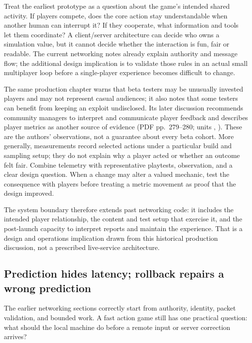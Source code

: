 Treat the earliest prototype as a question about the game's intended shared activity. If players compete, does the core action stay understandable when another human can interrupt it? If they cooperate, what information and tools let them coordinate? A client/server architecture can decide who owns a simulation value, but it cannot decide whether the interaction is fun, fair or readable. The current networking notes already explain authority and message flow; the additional design implication is to validate those rules in an actual small multiplayer loop before a single-player experience becomes difficult to change.

The same production chapter warns that beta testers may be unusually invested players and may not represent casual audiences; it also notes that some testers can benefit from keeping an exploit undisclosed. Its later discussion recommends community managers to interpret and communicate player feedback and describes player metrics as another source of evidence (PDF pp.~279--280; units , ). These are the authors' observations, not a guarantee about every beta cohort. More generally, measurements record selected actions under a particular build and sampling setup; they do not explain why a player acted or whether an outcome felt fair. Combine telemetry with representative playtests, observation, and a clear design question. When a change may alter a valued mechanic, test the consequence with players before treating a metric movement as proof that the design improved.

The system boundary therefore extends past networking code: it includes the intended player relationship, the content and test setup that exercise it, and the post-launch capacity to interpret reports and maintain the experience. That is a design and operations implication drawn from this historical production discussion, not a prescribed live-service architecture.

\subsection{Prediction hides latency; rollback repairs a wrong prediction}\label{06-engine-ii-ch047-prediction-hides-latency-rollback-repairs-a-wrong-prediction}

\hypertarget{06-engine-ii-ch047-prediction-hides-latency-rollback-repairs-a-wrong-prediction}{}

The earlier networking sections correctly start from authority, identity, packet validation, and bounded work. A fast action game still has one practical question: what should the local machine do before a remote input or server correction arrives?


